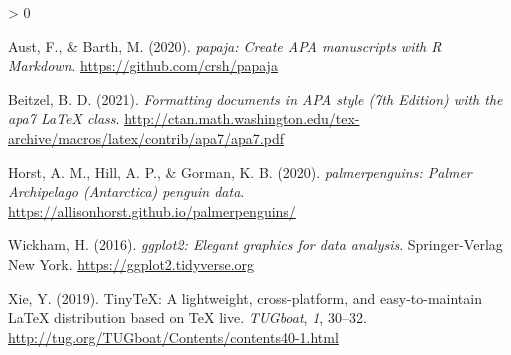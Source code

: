 \documentclass[jou]{apa7}
\newlength{\cslhangindent}
\newenvironment{CSLReferences}[2] %
 {%
  \setlength{\parindent}{0pt}
  \ifodd #1 \everypar{\setlength{\hangindent}{\cslhangindent}}\ignorespaces\fi
  \ifnum #2 > 0
  \setlength{\parskip}{#2\baselineskip}
  \fi
 }%
 {}
\begin{document}
\hypertarget{refs}{}
\begin{CSLReferences}{1}{0}
\leavevmode\hypertarget{ref-austbarth2020}{}%
Aust, F., \& Barth, M. (2020). \emph{{papaja}: {Create} {APA}
manuscripts with {R Markdown}}. \url{https://github.com/crsh/papaja}

\leavevmode\hypertarget{ref-weiss2021}{}%
Beitzel, B. D. (2021). \emph{Formatting documents in {APA} style (7th
{E}dition) with the apa7 LaTeX class}.
\url{http://ctan.math.washington.edu/tex-archive/macros/latex/contrib/apa7/apa7.pdf}

\leavevmode\hypertarget{ref-horst2020}{}%
Horst, A. M., Hill, A. P., \& Gorman, K. B. (2020).
\emph{{palmerpenguins}: {P}almer {A}rchipelago ({A}ntarctica) penguin
data}. \url{https://allisonhorst.github.io/palmerpenguins/}

\leavevmode\hypertarget{ref-wickham2016}{}%
Wickham, H. (2016). \emph{ggplot2: Elegant graphics for data analysis}.
Springer-Verlag New York. \url{https://ggplot2.tidyverse.org}

\leavevmode\hypertarget{ref-xie2019}{}%
Xie, Y. (2019). TinyTeX: A lightweight, cross-platform, and
easy-to-maintain LaTeX distribution based on TeX live. \emph{TUGboat},
\emph{1}, 30--32.
\url{http://tug.org/TUGboat/Contents/contents40-1.html}

\end{CSLReferences}
\end{document}
